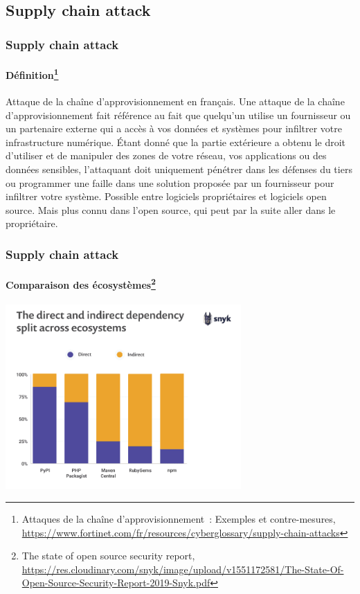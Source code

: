 \documentclass{beamer}
\begin{document}
    \subsection{Supply chain attack}\label{subsec:supply-chain-attack}
    \begin{frame}
        \frametitle{Supply chain attack}
        \framesubtitle{Définition\footnote{Attaques de la chaîne d’approvisionnement~: Exemples et contre-mesures, \url{https://www.fortinet.com/fr/resources/cyberglossary/supply-chain-attacks}}}
        \transdissolve
        Attaque de la chaîne d'approvisionnement en français.
        \bigbreak
        Une attaque de la chaîne d’approvisionnement fait référence au fait que quelqu’un utilise un fournisseur ou un partenaire externe qui a accès à vos données et systèmes pour infiltrer votre infrastructure numérique.
        Étant donné que la partie extérieure a obtenu le droit d’utiliser et de manipuler des zones de votre réseau, vos applications ou des données sensibles, l’attaquant doit uniquement pénétrer dans les défenses du tiers ou programmer une faille dans une solution proposée par un fournisseur pour infiltrer votre système.
        \bigbreak
        Possible entre logiciels propriétaires et logiciels open source.
        Mais plus connu dans l'open source, qui peut par la suite aller dans le propriétaire.
    \end{frame}

    \begin{frame}
        \frametitle{Supply chain attack}
        \framesubtitle{Comparaison des écosystèmes\footnote{\label{snyk}The state of open source security report, \url{https://res.cloudinary.com/snyk/image/upload/v1551172581/The-State-Of-Open-Source-Security-Report-2019-Snyk.pdf}}}
        \transdissolve
        \centering
        \includegraphics[width=9cm]{image/vuln-direct-indirect-dependencies}
    \end{frame}
\end{document}
